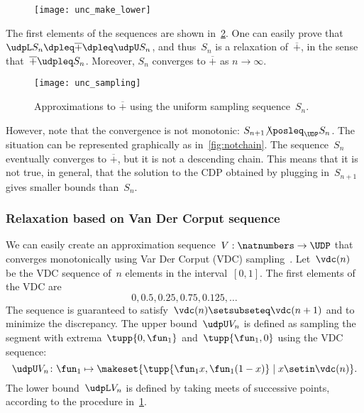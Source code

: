 \begin{figure}[h]
    \texttt{[image: unc\_make\_lower]}
    \caption{}
    \label{fig:make_lower}
\end{figure}

The first elements of the sequences are shown in~\cref{fig:approx_invplus}.
One can easily prove that $\udpL S_{n}\dpleq\overline{+}\dpleq\udpU S_{n}$, and thus~$S_{n}$ is a relaxation of~$\overline{+}$, in the sense that~$\overline{+}\udpleq S_{n}$.
Moreover, $S_{n}$ converges to $\overline{+}$ as $n\rightarrow\infty$.

\begin{figure}[h]
    \centering
    \texttt{[image: unc\_sampling]}
    \caption{Approximations to $\overline{+}$ using the uniform sampling sequence~$S_{n}$. }
    \label{fig:approx_invplus}
\end{figure}

However, note that the convergence is not monotonic: $S_{n+1}{\not\posleq}_{\UDP}S_{n}$.
The situation can be represented graphically as in~\cref{fig:notchain}.
The sequence~$S_{n}$ eventually converges to $\overline{+}$, but it is not a descending chain.
This means that it is not true, in general, that the solution to the CDP obtained by plugging in~$S_{n+1}$ gives smaller bounds than~$S_{n}$.

\subsubsection*{Relaxation based on Van Der Corput sequence}
\label{sec:van-der-corput}
We can easily create an approximation sequence~$V:\natnumbers\to\UDP$ that converges monotonically using Var Der Corput (VDC) sampling~\cite[Section 5.2]{LaValle2006Planning}.
Let~$\vdc(n)$ be the VDC sequence of~$n$ elements in the interval~$[0,1]$.
The first elements of the VDC are
\begin{equation}
    0,0.5,0.25,0.75,0.125,\dots
\end{equation}
The sequence is guaranteed to satisfy~$\vdc(n)\setsubseteq\vdc(n+1)$ and to minimize the discrepancy.
The upper bound~$\udpU V_{n}$ is defined as sampling the segment with extrema~$\tupp{ 0,\fun_{1}} $ and~$\tupp{\fun_{1},0}$ using the VDC sequence:
\begin{equation}
    \udpU V_{n}\colon\fun_{1}\mapsto\makeset{ \tupp{\fun_{1}x,\fun_{1}(1-x)} \mid x\setin\vdc(n)}.
\end{equation}
The lower bound~$\udpL V_{n}$ is defined by taking meets of successive points, according to the procedure in~\cref{fig:make_lower}.

